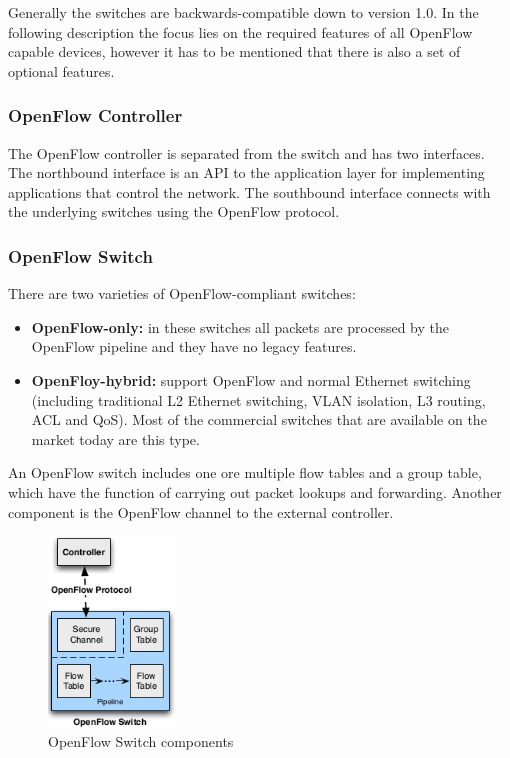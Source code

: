 Generally the switches are backwards-compatible down to version 1.0. In the following description the focus lies on the required features of all OpenFlow capable devices, however it has to be mentioned that there is also a set of optional features.

\subsubsection{OpenFlow Controller}

The OpenFlow controller is separated from the switch and has two interfaces. The northbound interface is an API to the application layer for implementing applications that control the network. The southbound interface connects with the underlying switches using the OpenFlow protocol.

\subsubsection{OpenFlow Switch}

There are two varieties of OpenFlow-compliant switches:
\begin{itemize}
\item \textbf{OpenFlow-only:} in these switches all packets are processed by the OpenFlow pipeline and they have no legacy features.
\item \textbf{OpenFloy-hybrid:} support OpenFlow and normal Ethernet switching (including traditional L2 Ethernet switching, VLAN isolation, L3 routing, ACL and QoS). Most of the commercial switches that are available on the market today are this type.
\end{itemize}

An OpenFlow switch includes one ore multiple flow tables and a group table, which have the function of carrying out packet lookups and forwarding. Another component is the OpenFlow channel to the external controller.

\begin{figure}[H]
\centering
\includegraphics[width=0.3\textwidth]{images/fundamentals/openflow_switch_components.png}
\caption{OpenFlow Switch components}
\end{figure}

